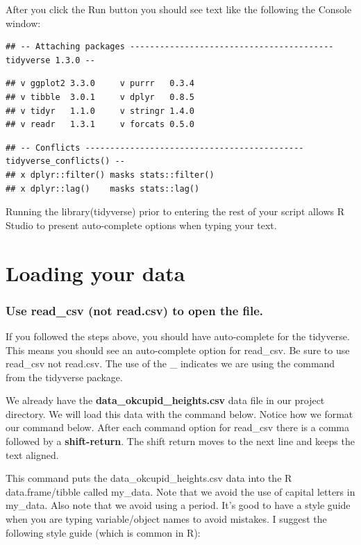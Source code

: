 \documentclass[
]{krantz}
\begin{document}
After you click the Run button you should see text like the following the Console window:

\begin{verbatim}
## -- Attaching packages ----------------------------------------- tidyverse 1.3.0 --
\end{verbatim}

\begin{verbatim}
## v ggplot2 3.3.0     v purrr   0.3.4
## v tibble  3.0.1     v dplyr   0.8.5
## v tidyr   1.1.0     v stringr 1.4.0
## v readr   1.3.1     v forcats 0.5.0
\end{verbatim}

\begin{verbatim}
## -- Conflicts -------------------------------------------- tidyverse_conflicts() --
## x dplyr::filter() masks stats::filter()
## x dplyr::lag()    masks stats::lag()
\end{verbatim}

Running the library(tidyverse) prior to entering the rest of your script allows R Studio to present auto-complete options when typing your text.

\hypertarget{loading-your-data}{%
\section{Loading your data}\label{loading-your-data}}

\hypertarget{use-read_csv-not-read.csv-to-open-the-file.}{%
\subsubsection{Use read\_csv (not read.csv) to open the file.}\label{use-read_csv-not-read.csv-to-open-the-file.}}

If you followed the steps above, you should have auto-complete for the tidyverse. This means you should see an auto-complete option for read\_csv. Be sure to use read\_csv not read.csv. The use of the \_ indicates we are using the command from the tidyverse package.

We already have the \textbf{data\_okcupid\_heights.csv} data file in our project directory. We will load this data with the command below. Notice how we format our command below. After each command option for read\_csv there is a comma followed by a \textbf{shift-return}. The shift return moves to the next line and keeps the text aligned.

This command puts the data\_okcupid\_heights.csv data into the R data.frame/tibble called my\_data. Note that we avoid the use of capital letters in my\_data. Also note that we avoid using a period. It's good to have a style guide when you are typing variable/object names to avoid mistakes. I suggest the following style guide (which is common in R):
\end{document}
